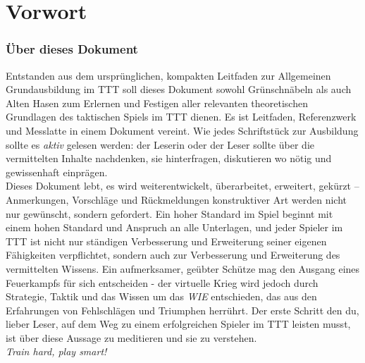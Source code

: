 \chapter*{Vorwort}
\subsection*{Über dieses Dokument}
	Entstanden aus dem ursprünglichen, kompakten Leitfaden zur Allgemeinen Grundausbildung im \ac{TTT} soll dieses Dokument sowohl Grünschnäbeln als auch Alten Hasen zum Erlernen und Festigen aller relevanten theoretischen Grundlagen des taktischen Spiels im \ac{TTT} dienen. Es ist Leitfaden, Referenzwerk und 		Messlatte in einem Dokument vereint. Wie jedes Schriftstück zur Ausbildung sollte es \textit{aktiv} gelesen werden: der Leserin oder der Leser sollte über die vermittelten Inhalte nachdenken, sie hinterfragen, diskutieren wo nötig und gewissenhaft einprägen.\\
	Dieses Dokument lebt, es wird weiterentwickelt, überarbeitet, erweitert, gekürzt -- Anmerkungen, Vorschläge und Rückmeldungen konstruktiver Art werden nicht nur gewünscht, sondern gefordert. Ein hoher Standard im Spiel beginnt mit einem hohen Standard und Anspruch an alle Unterlagen, und jeder Spieler im \ac{TTT} ist nicht nur ständigen Verbesserung und Erweiterung seiner eigenen Fähigkeiten verpflichtet, sondern auch zur Verbesserung und Erweiterung des vermittelten Wissens. Ein aufmerksamer, geübter Schütze mag den Ausgang eines Feuerkampfs für sich entscheiden - der virtuelle Krieg wird jedoch durch Strategie, Taktik und das Wissen um das \textit{WIE} entschieden, das aus den Erfahrungen von Fehlschlägen und Triumphen herrührt. Der erste Schritt den du, lieber Leser, auf dem Weg zu einem erfolgreichen Spieler im \ac{TTT} leisten musst, ist über diese Aussage zu meditieren und sie zu verstehen.\\

\textit{Train hard, play smart!}

\newpage
